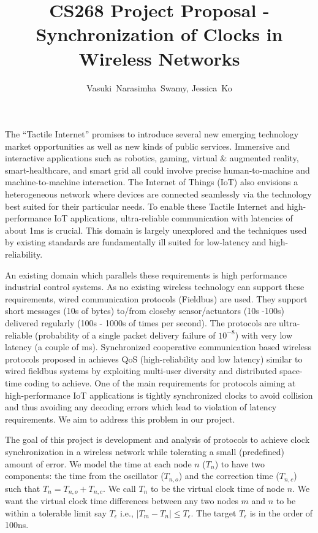 \documentclass[11pt, draftclsnofoot, onecolumn]{IEEEtran}
\begin{document}
\title{CS268 Project Proposal - Synchronization of Clocks in Wireless Networks}

\author{Vasuki~Narasimha~Swamy,
	Jessica~Ko}

\maketitle

The ``Tactile Internet'' promises to introduce several new emerging technology market opportunities as well as new kinds of public services. Immersive and interactive applications such as robotics, gaming, virtual \& augmented reality, smart-healthcare, and smart grid all could involve precise human-to-machine and machine-to-machine interaction.
The Internet of Things (IoT) also envisions a heterogeneous network where devices are connected seamlessly via the technology best suited for their particular needs.
To enable these Tactile Internet and high-performance IoT applications, ultra-reliable communication with latencies of about 1ms is crucial.
This domain is largely unexplored and the techniques used by existing standards are fundamentally ill suited for low-latency and high-reliability. %

An existing domain which parallels these requirements is high performance industrial control systems.
As no existing wireless technology can support these requirements, wired communication protocols (Fieldbus) are used.
They support short messages (10s of bytes) to/from closeby sensor/actuators (10s -100s) delivered regularly (100s - 1000s of times per second). The protocols are ultra-reliable (probability of a single packet delivery failure of $10^{-8}$) with very low latency (a couple of ms).
Synchronized cooperative communication based wireless protocols proposed in \cite{swamy2015cooperative, swamy2016cooperative} achieves QoS (high-reliability and low latency) similar to wired fieldbus systems by exploiting multi-user diversity and distributed space-time coding to achieve.
One of the main requirements for protocols aiming at high-performance IoT applications is tightly synchronized clocks to avoid collision and thus avoiding any decoding errors which lead to violation of latency requirements. We aim to address this problem in our project.

The goal of this project is development and analysis of protocols to achieve clock synchronization in a wireless network while tolerating a small (predefined) amount of error.
We model the time at each node $n$ ($T_n$) to have two components: the time from the oscillator ($T_{n,o}$) and the correction time ($T_{n,c}$) such that $T_n = T_{n,o} + T_{n,c}$. We call $T_n$ to be the virtual clock time of node $n$. We want the virtual clock time differences between any two nodes $m$ and $n$ to be within a tolerable limit say $T_{\epsilon}$ i.e., $|T_m - T_n| \leq T_{\epsilon}$. The target $T_{\epsilon}$ is in the order of 100ns.
\end{document}
